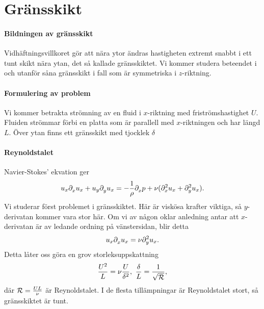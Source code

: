 \section{Gränsskikt}

\paragraph{Bildningen av gränsskikt}
Vidhäftningsvillkoret gör att nära ytor ändras hastigheten extremt snabbt i ett tunt skikt nära ytan, det så kallade gränsskiktet. Vi kommer studera beteendet i och utanför såna gränsskikt i fall som är symmetriska i $z$-riktning.

\paragraph{Formulering av problem}
Vi kommer betrakta strömning av en fluid i $x$-riktning med friströmshastighet $U$. Fluiden strömmar förbi en platta som är parallell med $x$-riktningen och har längd $L$. Över ytan finns ett gränsskikt med tjocklek $\delta$

\paragraph{Reynoldstalet}
Navier-Stokes' ekvation ger
\begin{align*}
	u_{x}\del{x}{u_{x}} + u_{y}\del{y}{u_{x}} = -\frac{1}{\rho}\del{x}{p} + \nu(\del[2]{x}{u_{x}} + \del[2]{y}{u_{x}}).
\end{align*}
Vi studerar först problemet i gränsskiktet. Här är viskösa krafter viktiga, så $y$-derivatan kommer vara stor här. Om vi av någon oklar anledning antar att $x$-derivatan är av ledande ordning på vänstersidan, blir detta
\begin{align*}
	u_{x}\del{x}{u_{x}} = \nu\del[2]{y}{u_{x}}.
\end{align*}
Detta låter oss göra en grov storleksuppskattning
\begin{align*}
	\frac{U^{2}}{L} = \nu\frac{U}{\delta^{2}},\ \frac{\delta}{L} = \frac{1}{\sqrt{\rey}},
\end{align*}
där $\rey = \frac{UL}{\nu}$ är Reynoldstalet. I de flesta tillämpningar är Reynoldstalet stort, så gränsskiktet är tunt.

